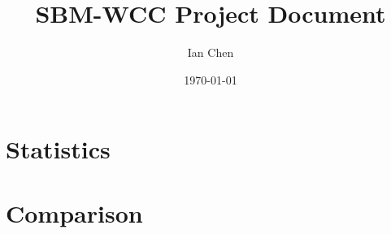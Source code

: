 \documentclass[aps,pre,superscriptaddress]{revtex4}
\begin{document}

\title{SBM-WCC Project Document}
\author{Ian Chen}
\date{\today}
\maketitle

\section{Statistics}

\section{Comparison}



\end{document}
